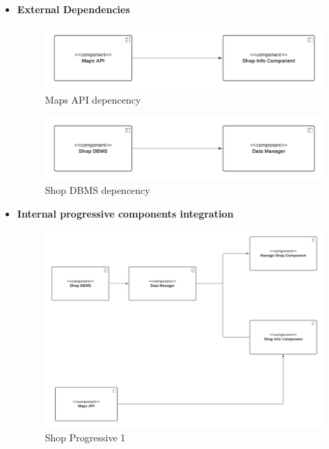 \begin{itemize}
    \item \textbf{External Dependencies}
    \begin{figure}[h!]
        \centering
        \includegraphics[width=.8\textwidth]{Images/TestDiagram/Shop/maps.png}
        \caption{\label{fig:ShopExternalDepMAPS}{Maps API depencency}}
    \end{figure}
    \FloatBarrier  
    
    \begin{figure}[h!]
        \centering
        \includegraphics[width=.8\textwidth]{Images/TestDiagram/Shop/data.png}
        \caption{\label{fig:ShopExternalDepDBMS}{Shop DBMS depencency}}
    \end{figure}
    \FloatBarrier
    \item \textbf{Internal progressive components integration} 
    \begin{figure}[h!]
        \centering
        \includegraphics[width=1\textwidth]{Images/TestDiagram/Shop/2Shop(1).png}
        \caption{\label{fig:Shopinternal}{Shop Progressive 1}}
    \end{figure}
    \FloatBarrier  
\end{itemize}

